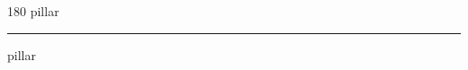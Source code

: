 
\begin{frame}
\begin{center}
\begin{turn}{180}
{\fontsize{2.5cm}{1em}\selectfont pillar}
\end{turn}
\vspace{1em}\par  
\hrule
\vspace{1em}\par  
{\fontsize{2.5cm}{1em}\selectfont pillar}
\end{center}
\end{frame}
